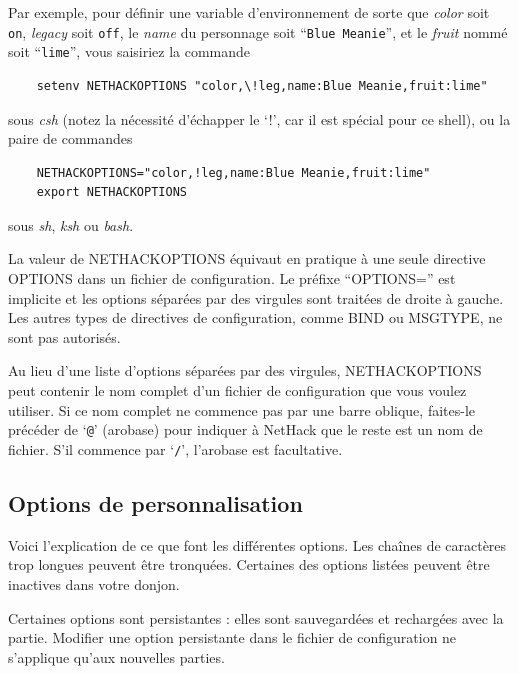 \documentclass[titlepage]{article}
\begin{document}
Par exemple, pour définir une variable d'environnement de sorte que
\textit{color} soit \texttt{on},
\textit{legacy} soit \texttt{off},
le \textit{name} du personnage soit ``\texttt{Blue Meanie}'',
et le \textit{fruit} nommé soit ``\texttt{lime}'',
vous saisiriez la commande
\begin{verbatim}
    setenv NETHACKOPTIONS "color,\!leg,name:Blue Meanie,fruit:lime"
\end{verbatim}

\noindent sous \textit{csh}
(notez la nécessité d'échapper le `!', car il est spécial
pour ce shell), ou la paire de commandes
\begin{verbatim}
    NETHACKOPTIONS="color,!leg,name:Blue Meanie,fruit:lime"
    export NETHACKOPTIONS
\end{verbatim}

\noindent sous \textit{sh}, \textit{ksh} ou \textit{bash}.

La valeur de NETHACKOPTIONS équivaut en pratique à une seule directive OPTIONS
dans un fichier de configuration.
Le préfixe ``OPTIONS='' est implicite et les options séparées par des virgules sont
traitées de droite à gauche.
Les autres types de directives de configuration, comme BIND ou MSGTYPE, ne
sont pas autorisés.

Au lieu d'une liste d'options séparées par des virgules,
NETHACKOPTIONS peut contenir le nom complet d'un fichier de configuration que
vous voulez utiliser.
Si ce nom complet ne commence pas par une barre oblique, faites-le précéder de `\texttt{@}'
(arobase) pour indiquer à NetHack que le reste est un nom de fichier.
S'il commence par `\texttt{/}', l'arobase est facultative.

\subsection*{Options de personnalisation}

Voici l'explication de ce que font les différentes options.
Les chaînes de caractères trop longues peuvent être tronquées.
Certaines des options listées peuvent être inactives dans votre donjon.

Certaines options sont persistantes : elles sont sauvegardées et rechargées avec
la partie. Modifier une option persistante dans le fichier de configuration
ne s'applique qu'aux nouvelles parties.
\end{document}
